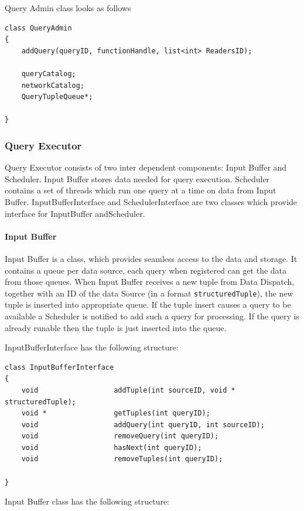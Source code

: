\documentclass[14pt]{article}
\begin{document}
Query Admin class looks as follows
\begin{verbatim}
class QueryAdmin
{
    addQuery(queryID, functionHandle, list<int> ReadersID);

	queryCatalog;
	networkCatalog;
	QueryTupleQueue*;
	
}
\end{verbatim}

\subsubsection{Query Executor}

Query Executor consists of two inter dependent components: Input Buffer and Scheduler. Input Buffer stores data needed for query execution. Scheduler contains a set of threads which run one query at a time on data from Input Buffer. InputBufferInterface and SchedulerInterface are two classes which provide interface for InputBuffer andScheduler. 

\paragraph{Input Buffer}

Input Buffer is a class, which provides seamless access to the data and storage. It contains a queue per data source, each query when registered can get the data from those queues. When Input Buffer receives a new tuple from Data Dispatch, together with an ID of the data Source (in a format {\tt structuredTuple}), the new tuple is inserted into appropriate queue. If the tuple insert causes a query to be available a Scheduler is notified to add such a query for processing. If the query is already runable then the tuple is just inserted into the queue.

\noindent InputBufferInterface has the following structure:

\begin{verbatim}
class InputBufferInterface
{
    void                  addTuple(int sourceID, void * structuredTuple);
    void *                getTuples(int queryID);
    void                  addQuery(int queryID, int sourceID);
    void                  removeQuery(int queryID);
    void                  hasNext(int queryID);
    void                  removeTuples(int queryID);
	
}
\end{verbatim}

Input Buffer class has the following structure:
\end{document}
